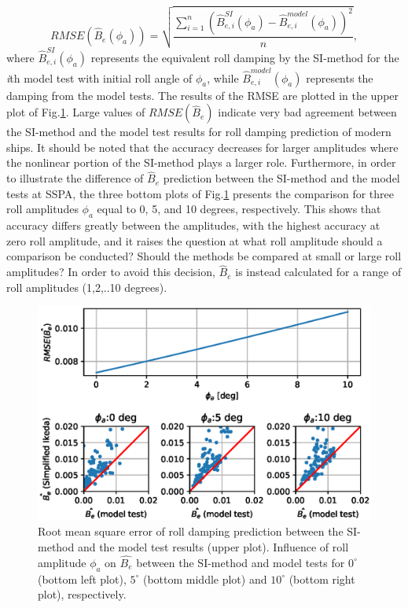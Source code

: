 \begin{equation} \label{eq:rmse}
    RMSE({\hat{B}_e} (\phi_a)) = \sqrt{\frac{\sum\limits_{i=1}^n (\hat{B}_{e,i}^{SI} (\phi_a) - \hat{B}_{e,i}^{model} (\phi_a))^2}{n}},
\end{equation}
where $\hat{B}_{e,i}^{SI} (\phi_a)$ represents the equivalent roll damping by the SI-method for the \emph{i}th model test with initial roll angle of $\phi_a$, while $\hat{B}_{e,i}^{model} (\phi_a)$ represents the damping from the model tests. The results of the RMSE are plotted in the upper plot of Fig.\ref{fig:ikeda_phi_a}. Large values of $RMSE({\hat{B}_e})$ indicate very bad agreement between the SI-method and the model test results for roll damping prediction of modern ships. It should be noted that the accuracy decreases for larger amplitudes where the nonlinear portion of the SI-method plays a larger role. Furthermore, in order to illustrate the difference of $\hat{B}_e$ prediction between the SI-method and the model tests at SSPA, the three bottom plots of Fig.\ref{fig:ikeda_phi_a} presents the comparison for three roll amplitudes $\phi_a$ equal to 0, 5, and 10 degrees, respectively. This shows that accuracy differs greatly between the amplitudes, with the highest accuracy at zero roll amplitude, and it raises the question at what roll amplitude should a comparison be conducted? Should the methods be compared at small or large roll amplitudes? In order to avoid this decision, $\hat{B}_e$ is instead calculated for a range of roll amplitudes (1,2,..10 degrees).   

\begin{figure}[H]
\centering
  \centering
  \includegraphics[]{figures/ikeda_phi_a.eps}
  \vspace{-0.5cm}
  \caption{Root mean square error of roll damping prediction between the SI-method and the model test results (upper plot). Influence of roll amplitude $\phi_a$ on $\hat{B_e}$ between the SI-method and model tests for $0^{\circ}$ (bottom left plot), $5^{\circ}$ (bottom middle plot) and $10^{\circ}$ (bottom right plot), respectively.}
  \label{fig:ikeda_phi_a}
\end{figure}

